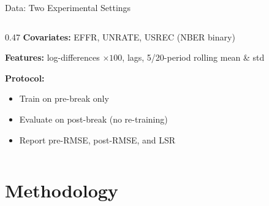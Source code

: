 \documentclass[aspectratio=169, 10pt]{beamer}
\begin{document}
\begin{frame}{Data: Two Experimental Settings}
\begin{columns}[T]
\begin{column}{0.47\textwidth}
      \vspace{6pt}
      \textbf{Covariates:} EFFR, UNRATE, USREC (NBER binary)

      \vspace{4pt}
      \textbf{Features:} log-differences $\times100$, lags, 5/20-period rolling mean \& std

      \vspace{4pt}
      \textbf{Protocol:}
      \begin{itemize}\setlength\itemsep{2pt}
        \item Train on pre-break only
        \item Evaluate on post-break (no re-training)
        \item Report pre-RMSE, post-RMSE, and LSR
      \end{itemize}
    \end{column}
  \end{columns}

\end{frame}

\section{Methodology}
\end{document}

